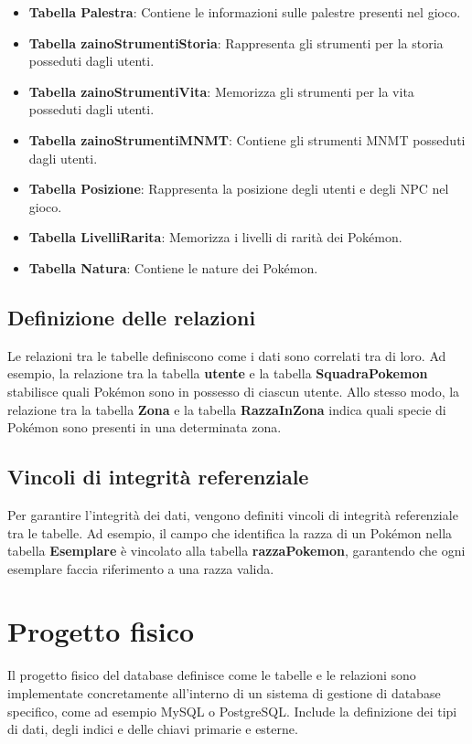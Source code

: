 \documentclass{article}
\begin{document}
\begin{itemize}
    \item \textbf{Tabella Palestra}: Contiene le informazioni sulle palestre presenti nel gioco.
    \item \textbf{Tabella zainoStrumentiStoria}: Rappresenta gli strumenti per la storia posseduti dagli utenti.
    \item \textbf{Tabella zainoStrumentiVita}: Memorizza gli strumenti per la vita posseduti dagli utenti.
    \item \textbf{Tabella zainoStrumentiMNMT}: Contiene gli strumenti MNMT posseduti dagli utenti.
    \item \textbf{Tabella Posizione}: Rappresenta la posizione degli utenti e degli NPC nel gioco.
    \item \textbf{Tabella LivelliRarita}: Memorizza i livelli di rarità dei Pokémon.
    \item \textbf{Tabella Natura}: Contiene le nature dei Pokémon.
\end{itemize}

\subsection{Definizione delle relazioni}

Le relazioni tra le tabelle definiscono come i dati sono correlati tra di loro. Ad esempio, la relazione tra la tabella \textbf{utente} e la tabella \textbf{SquadraPokemon} stabilisce quali Pokémon sono in possesso di ciascun utente. Allo stesso modo, la relazione tra la tabella \textbf{Zona} e la tabella \textbf{RazzaInZona} indica quali specie di Pokémon sono presenti in una determinata zona.

\subsection{Vincoli di integrità referenziale}

Per garantire l'integrità dei dati, vengono definiti vincoli di integrità referenziale tra le tabelle. Ad esempio, il campo che identifica la razza di un Pokémon nella tabella \textbf{Esemplare} è vincolato alla tabella \textbf{razzaPokemon}, garantendo che ogni esemplare faccia riferimento a una razza valida.

\section{Progetto fisico}

Il progetto fisico del database definisce come le tabelle e le relazioni sono implementate concretamente all'interno di un sistema di gestione di database specifico, come ad esempio MySQL o PostgreSQL. Include la definizione dei tipi di dati, degli indici e delle chiavi primarie e esterne.
\end{document}
